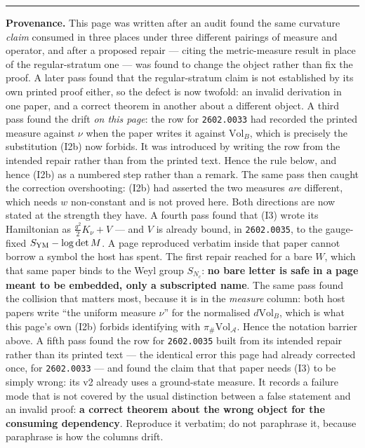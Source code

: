 \documentclass[11pt]{article}
\newcommand{\A}{\mathcal A}
\begin{document}
\vspace{4pt}
\noindent\rule{\textwidth}{0.8pt}

\noindent\footnotesize
\textbf{Provenance.} This page was written after an audit found the same curvature
\emph{claim} consumed in three places under three different pairings of measure and
operator, and after a proposed repair --- citing the metric-measure result in place of
the regular-stratum one --- was found to change the object rather than fix the proof.
A later pass found that the regular-stratum claim is not established by its own
printed proof either, so the defect is now twofold: an invalid derivation in one
paper, and a correct theorem in another about a different object.
A third pass found the drift \emph{on this page}: the row for \texttt{2602.0033} had
recorded the printed measure against $\nu$ when the paper writes it against
$\mathrm{Vol}_B$, which is precisely the substitution (I2b) now forbids. It was
introduced by writing the row from the intended repair rather than from the printed
text. Hence the rule below, and hence (I2b) as a numbered step rather than a remark.
The same pass then caught the correction overshooting: (I2b) had asserted the two
measures \emph{are} different, which needs $w$ non-constant and is not proved here.
Both directions are now stated at the strength they have.
A fourth pass found that (I3) wrote its Hamiltonian as $\frac{g^2}{2}K_\nu+V$ --- and
$V$ is already bound, in \texttt{2602.0035}, to the gauge-fixed
$S_{\rm YM}-\log\det M$. A page reproduced verbatim inside that paper cannot borrow a
symbol the host has spent. The first repair reached for a bare $W$, which that same
paper binds to the Weyl group $S_{N_c}$: \textbf{no bare letter is safe in a page
meant to be embedded, only a subscripted name}. The same pass found the collision that
matters most, because it is in the \emph{measure} column: both host papers write
``the uniform measure $\nu$'' for the normalised $d\mathrm{Vol}_B$, which is what this
page's own (I2b) forbids identifying with $\pi_\#\mathrm{Vol}_{\A}$. Hence the notation
barrier above. A fifth pass found the row for
\texttt{2602.0035} built from its intended repair rather than its printed text --- the
identical error this page had already corrected once, for \texttt{2602.0033} --- and
found the claim that that paper needs (I3) to be simply wrong: its v2 already uses a
ground-state measure.
It records a failure mode that is not covered by the usual distinction between a false
statement and an invalid proof: \textbf{a correct theorem about the wrong object for
the consuming dependency}. Reproduce it verbatim; do not paraphrase it, because
paraphrase is how the columns drift.
\end{document}
